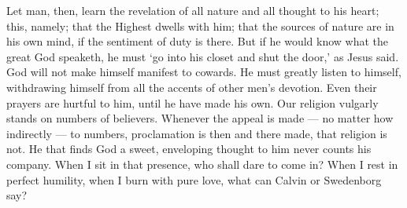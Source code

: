 \documentclass{article}
\begin{document}
Let man, then, learn the revelation of all nature and all thought to his heart; this, namely; that the Highest dwells with him; that the sources of nature are in his own mind, if the sentiment of duty is there. But if he would know what the great God speaketh, he must `go into his closet and shut the door,' as Jesus said. God will not make himself manifest to cowards. He must greatly listen to himself, withdrawing himself from all the accents of other men's devotion. Even their prayers are hurtful to him, until he have made his own. Our religion vulgarly stands on numbers of believers. Whenever the appeal is made --- no matter how indirectly --- to numbers, proclamation is then and there made, that religion is not. He that finds God a sweet, enveloping thought to him never counts his company. When I sit in that presence, who shall dare to come in? When I rest in perfect humility, when I burn with pure love, what can Calvin or Swedenborg say?
\end{document}

